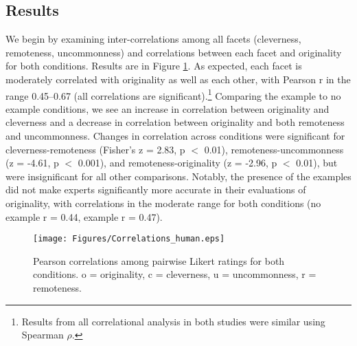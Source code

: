 
\subsection{Results}
We begin by examining inter-correlations among all facets (cleverness, remoteness, uncommonness) and correlations between each facet and originality for both conditions. Results are in Figure \ref{fig:experiment_1_correlations}. As expected, each facet is moderately correlated with originality as well as each other, with Pearson r in the range 0.45--0.67 (all correlations are significant).\footnote{Results from all correlational analysis in both studies were similar using Spearman $\rho$.} Comparing the example to no example conditions, we see an increase in correlation between originality and cleverness and a decrease in correlation between originality and both remoteness and uncommonness. Changes in correlation across conditions were significant for cleverness-remoteness (Fisher's z = 2.83, p $<$ 0.01), remoteness-uncommonness (z = -4.61, p $<$ 0.001), and remoteness-originality (z = -2.96, p $<$ 0.01), but were insignificant for all other comparisons. Notably, the presence of the examples did not make experts significantly more accurate in their evaluations of originality, with correlations in the moderate range for both conditions (no example r = 0.44, example r = 0.47).




\begin{figure}[htb]
    \centering
    \footnotesize
    \texttt{[image: Figures/Correlations\_human.eps]}
    \caption{Pearson correlations among pairwise Likert ratings for both conditions. o = originality, c = cleverness, u = uncommonness, r = remoteness.}
    \label{fig:experiment_1_correlations}
\end{figure}

